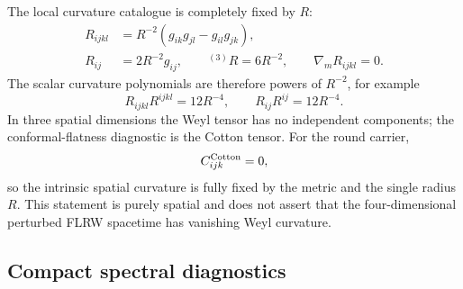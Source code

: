\documentclass[aps,prd,onecolumn,superscriptaddress,longbibliography,nofootinbib,notitlepage]{revtex4-2}
\begin{document}
The local curvature catalogue is completely fixed by $R$:
\begin{equation}
\begin{aligned}
  R_{ijkl} &= R^{-2}(g_{ik}g_{jl}-g_{il}g_{jk}),\\
  R_{ij} &= 2R^{-2}g_{ij},
  \qquad {}^{(3)}R = 6R^{-2},
  \qquad \nabla_mR_{ijkl}=0 .
\end{aligned}
\end{equation}
The scalar curvature polynomials are therefore powers of $R^{-2}$, for example
\begin{equation}
  R_{ijkl}R^{ijkl}=12R^{-4},
  \qquad
  R_{ij}R^{ij}=12R^{-4}.
\end{equation}
In three spatial dimensions the Weyl tensor has no independent components; the
conformal-flatness diagnostic is the Cotton tensor. For the round carrier,
\begin{equation}
  C^{\rm Cotton}_{ijk}=0,
\end{equation}
so the intrinsic spatial curvature is fully fixed by the metric and the single radius
$R$. This statement is purely spatial and does not assert that the four-dimensional
perturbed FLRW spacetime has vanishing Weyl curvature.

\subsection{Compact spectral diagnostics}
\end{document}
